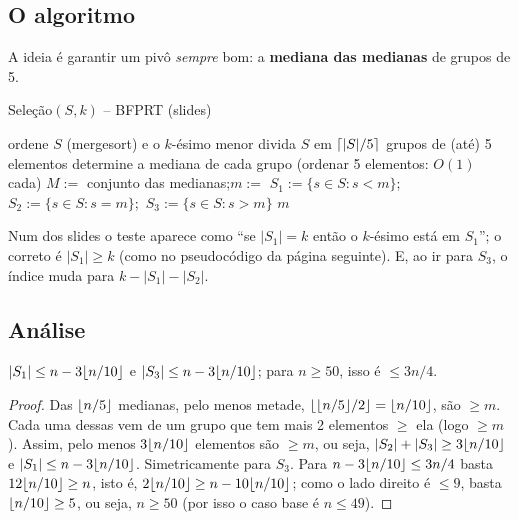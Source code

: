 \subsection{O algoritmo}
A ideia é garantir um pivô \emph{sempre} bom: a \textbf{mediana das medianas} de grupos de 5.
\begin{pseudo}{Seleção$(S,k)$ -- BFPRT (slides)}
\begin{algorithmic}
   \State ordene $S$ (mergesort) e \Return o $k$-ésimo menor \EndIf
  \State divida $S$ em $\lceil|S|/5\rceil$ grupos de (até) 5 elementos
  \State determine a mediana de cada grupo (ordenar 5 elementos: $O(1)$ cada)
  \State $M:=$ conjunto das medianas;\quad $m:=$  
  \State $S_1:=\{s\in S: s<m\}$;\ $S_2:=\{s\in S: s=m\}$;\ $S_3:=\{s\in S: s>m\}$
   \State \Return {} 
   \State \Return $m$
  \Else \State \Return {}
  \EndIf
\EndFunction
\end{algorithmic}
\end{pseudo}
\begin{cuidado}
Num dos slides o teste aparece como ``se $|S_1|=k$ então o $k$-ésimo está em $S_1$''; o correto é \textbf{$|S_1|\ge k$} (como no pseudocódigo da página seguinte). E, ao ir para $S_3$, o índice muda para $k-|S_1|-|S_2|$.
\end{cuidado}

\subsection{Análise}
\begin{lema}
$|S_1|\le n-3\lfloor n/10\rfloor$ e $|S_3|\le n-3\lfloor n/10\rfloor$; para $n\ge50$, isso é $\le 3n/4$.
\end{lema}
\begin{proof}
Das $\lfloor n/5\rfloor$ medianas, pelo menos metade, $\lfloor\lfloor n/5\rfloor/2\rfloor=\lfloor n/10\rfloor$, são $\ge m$. Cada uma dessas vem de um grupo que tem mais 2 elementos $\ge$ ela (logo $\ge m$). Assim, pelo menos $3\lfloor n/10\rfloor$ elementos são $\ge m$, ou seja, $|S_2|+|S_3|\ge3\lfloor n/10\rfloor$ e $|S_1|\le n-3\lfloor n/10\rfloor$. Simetricamente para $S_3$.
Para $n-3\lfloor n/10\rfloor\le3n/4$ basta $12\lfloor n/10\rfloor\ge n$, isto é, $2\lfloor n/10\rfloor\ge n-10\lfloor n/10\rfloor$; como o lado direito é $\le9$, basta $\lfloor n/10\rfloor\ge5$, ou seja, $n\ge50$ (por isso o caso base é $n\le49$).
\end{proof}

